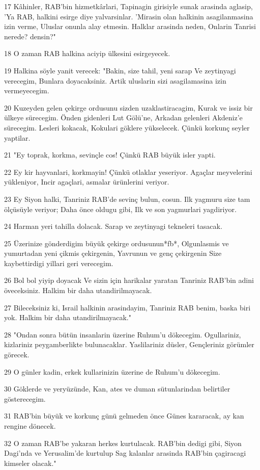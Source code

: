 \par 17 Kâhinler, RAB'bin hizmetkârlari, Tapinagin girisiyle sunak arasinda aglasip, 'Ya RAB, halkini esirge diye yalvarsinlar. 'Mirasin olan halkinin asagilanmasina izin verme, Uluslar onunla alay etmesin. Halklar arasinda neden, Onlarin Tanrisi nerede? densin?"
\par 18 O zaman RAB halkina aciyip ülkesini esirgeyecek.
\par 19 Halkina söyle yanit verecek: "Bakin, size tahil, yeni sarap Ve zeytinyagi verecegim, Bunlara doyacaksiniz. Artik uluslarin sizi asagilamasina izin vermeyecegim.
\par 20 Kuzeyden gelen çekirge ordusunu sizden uzaklastiracagim, Kurak ve issiz bir ülkeye sürecegim. Önden gidenleri Lut Gölü'ne, Arkadan gelenleri Akdeniz'e sürecegim. Lesleri kokacak, Kokulari göklere yükselecek. Çünkü korkunç seyler yaptilar.
\par 21 "Ey toprak, korkma, sevinçle cos! Çünkü RAB büyük isler yapti.
\par 22 Ey kir hayvanlari, korkmayin! Çünkü otlaklar yeseriyor. Agaçlar meyvelerini yükleniyor, Incir agaçlari, asmalar ürünlerini veriyor.
\par 23 Ey Siyon halki, Tanriniz RAB'de sevinç bulun, cosun. Ilk yagmuru size tam ölçüsüyle veriyor; Daha önce oldugu gibi, Ilk ve son yagmurlari yagdiriyor.
\par 24 Harman yeri tahilla dolacak. Sarap ve zeytinyagi tekneleri tasacak.
\par 25 Üzerinize gönderdigim büyük çekirge ordusunun*fb*, Olgunlasmis ve yumurtadan yeni çikmis çekirgenin, Yavrunun ve genç çekirgenin Size kaybettirdigi yillari geri verecegim.
\par 26 Bol bol yiyip doyacak Ve sizin için harikalar yaratan Tanriniz RAB'bin adini öveceksiniz. Halkim bir daha utandirilmayacak.
\par 27 Bileceksiniz ki, Israil halkinin arasindayim, Tanriniz RAB benim, baska biri yok. Halkim bir daha utandirilmayacak."
\par 28 "Ondan sonra bütün insanlarin üzerine Ruhum'u dökecegim. Ogullariniz, kizlariniz peygamberlikte bulunacaklar. Yaslilariniz düsler, Gençleriniz görümler görecek.
\par 29 O günler kadin, erkek kullarinizin üzerine de Ruhum'u dökecegim.
\par 30 Göklerde ve yeryüzünde, Kan, ates ve duman sütunlarindan belirtiler gösterecegim.
\par 31 RAB'bin büyük ve korkunç günü gelmeden önce Günes kararacak, ay kan rengine dönecek.
\par 32 O zaman RAB'be yakaran herkes kurtulacak. RAB'bin dedigi gibi, Siyon Dagi'nda ve Yerusalim'de kurtulup Sag kalanlar arasinda RAB'bin çagiracagi kimseler olacak."

